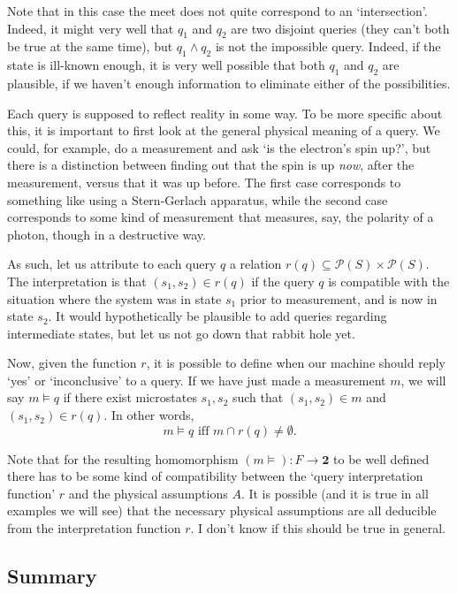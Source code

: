 \documentclass{article}
\theoremstyle{definition}
\theoremstyle{plain}
\newcommand{\ps}{\mathcal{P}}
\newcommand{\two}{\mathbf{2}}
\begin{document}
Note that in this case the meet does not quite correspond to an `intersection'. Indeed, it might very well that $q_1$ and $q_2$ are two disjoint queries (they can't both be true at the same time), but $q_1 \land q_2$ is not the impossible query. Indeed, if the state is ill-known enough, it is very well possible that both $q_1$ and $q_2$ are plausible, if we haven't enough information to eliminate either of the possibilities.

Each query is supposed to reflect reality in some way. To be more specific about this, it is important to first look at the general physical meaning of a query. We could, for example, do a measurement and ask `is the electron's spin up?', but there is a distinction between finding out that the spin is up \emph{now}, after the measurement, versus that it was up before. The first case corresponds to something like using a Stern-Gerlach apparatus, while the second case corresponds to some kind of measurement that measures, say, the polarity of a photon, though in a destructive way.

As such, let us attribute to each query $q$ a relation $r(q) \subseteq \ps(S) \times \ps(S)$. The interpretation is that $(s_1, s_2) \in r(q)$ if the query $q$ is compatible with the situation where the system was in state $s_1$ prior to measurement, and is now in state $s_2$. It would hypothetically be plausible to add queries regarding intermediate states, but let us not go down that rabbit hole yet.

Now, given the function $r$, it is possible to define when our machine should reply `yes' or `inconclusive' to a query. If we have just made a measurement $m$, we will say $m \vDash q$ if there exist microstates $s_1, s_2$ such that $(s_1, s_2) \in m$ and $(s_1, s_2) \in r(q)$. In other words,
\begin{equation}\label{defvdash}
m \vDash q \text{ iff } m \cap r(q) \neq \emptyset.
\end{equation}

Note that for the resulting homomorphism $(m\vDash) : F \to \two$ to be well defined there has to be some kind of compatibility between the `query interpretation function' $r$ and the physical assumptions $A$. It is possible (and it is true in all examples we will see) that the necessary physical assumptions are all deducible from the interpretation function $r$. I don't know if this should be true in general.

\subsection{Summary}
\end{document}
